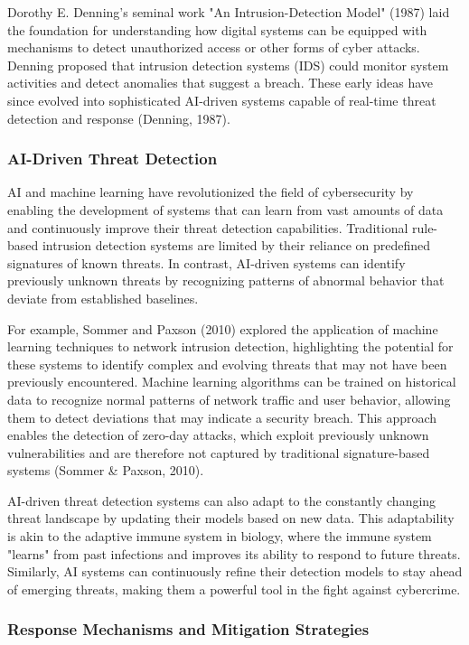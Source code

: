 \documentclass[12pt,twoside]{article}
\begin{document}
Dorothy E. Denning's seminal work "An Intrusion-Detection Model" (1987) laid the foundation for understanding how digital systems can be equipped with mechanisms to detect unauthorized access or other forms of cyber attacks. Denning proposed that intrusion detection systems (IDS) could monitor system activities and detect anomalies that suggest a breach. These early ideas have since evolved into sophisticated AI-driven systems capable of real-time threat detection and response (Denning, 1987).

\subsubsection{AI-Driven Threat Detection}

AI and machine learning have revolutionized the field of cybersecurity by enabling the development of systems that can learn from vast amounts of data and continuously improve their threat detection capabilities. Traditional rule-based intrusion detection systems are limited by their reliance on predefined signatures of known threats. In contrast, AI-driven systems can identify previously unknown threats by recognizing patterns of abnormal behavior that deviate from established baselines.

For example, Sommer and Paxson (2010) explored the application of machine learning techniques to network intrusion detection, highlighting the potential for these systems to identify complex and evolving threats that may not have been previously encountered. Machine learning algorithms can be trained on historical data to recognize normal patterns of network traffic and user behavior, allowing them to detect deviations that may indicate a security breach. This approach enables the detection of zero-day attacks, which exploit previously unknown vulnerabilities and are therefore not captured by traditional signature-based systems (Sommer & Paxson, 2010).

AI-driven threat detection systems can also adapt to the constantly changing threat landscape by updating their models based on new data. This adaptability is akin to the adaptive immune system in biology, where the immune system "learns" from past infections and improves its ability to respond to future threats. Similarly, AI systems can continuously refine their detection models to stay ahead of emerging threats, making them a powerful tool in the fight against cybercrime.

\subsubsection{Response Mechanisms and Mitigation Strategies}
\end{document}
